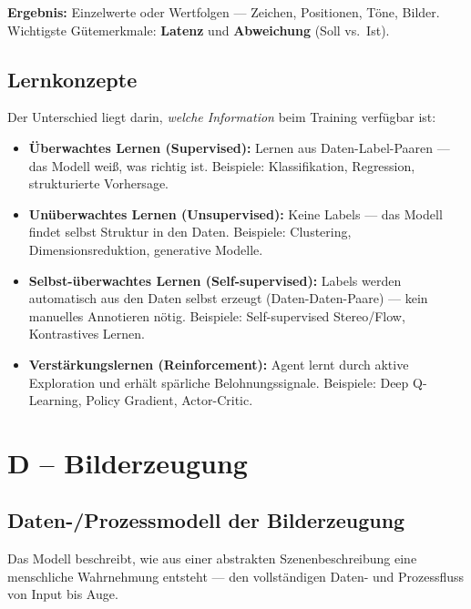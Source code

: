 \documentclass[12pt, a4paper]{article}
\begin{document}
\textbf{Ergebnis:} Einzelwerte oder Wertfolgen — Zeichen, Positionen, Töne, Bilder. Wichtigste Gütemerkmale: \textbf{Latenz} und \textbf{Abweichung} (Soll vs.\ Ist).

\subsection{Lernkonzepte}

Der Unterschied liegt darin, \textit{welche Information} beim Training verfügbar ist:

\begin{itemize}
  \item \textbf{Überwachtes Lernen (Supervised):} Lernen aus Daten-Label-Paaren — das Modell weiß, was richtig ist. Beispiele: Klassifikation, Regression, strukturierte Vorhersage.

  \item \textbf{Unüberwachtes Lernen (Unsupervised):} Keine Labels — das Modell findet selbst Struktur in den Daten. Beispiele: Clustering, Dimensionsreduktion, generative Modelle.

  \item \textbf{Selbst-überwachtes Lernen (Self-supervised):} Labels werden automatisch aus den Daten selbst erzeugt (Daten-Daten-Paare) — kein manuelles Annotieren nötig. Beispiele: Self-supervised Stereo/Flow, Kontrastives Lernen.

  \item \textbf{Verstärkungslernen (Reinforcement):} Agent lernt durch aktive Exploration und erhält spärliche Belohnungssignale. Beispiele: Deep Q-Learning, Policy Gradient, Actor-Critic.
\end{itemize}

\section{D -- Bilderzeugung}

\subsection{Daten-/Prozessmodell der Bilderzeugung}

Das Modell beschreibt, wie aus einer abstrakten Szenenbeschreibung eine menschliche Wahrnehmung entsteht — den vollständigen Daten- und Prozessfluss von Input bis Auge.
\end{document}
